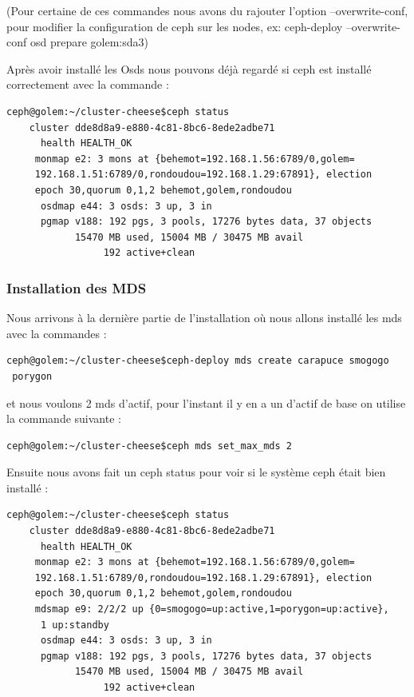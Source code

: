 \documentclass[12pt]{article}
\begin{document}
(Pour certaine de ces commandes nous avons du rajouter l'option --overwrite-conf, pour modifier la configuration de ceph sur les nodes, 
ex: ceph-deploy --overwrite-conf osd prepare golem:sda3)

Après avoir installé les Osds nous pouvons déjà regardé si ceph est installé correctement avec la commande :
\begin{verbatim}
ceph@golem:~/cluster-cheese$ceph status     
    cluster dde8d8a9-e880-4c81-8bc6-8ede2adbe71
      health HEALTH_OK  
     monmap e2: 3 mons at {behemot=192.168.1.56:6789/0,golem=
     192.168.1.51:6789/0,rondoudou=192.168.1.29:67891}, election 
     epoch 30,quorum 0,1,2 behemot,golem,rondoudou 
      osdmap e44: 3 osds: 3 up, 3 in 
      pgmap v188: 192 pgs, 3 pools, 17276 bytes data, 37 objects 
            15470 MB used, 15004 MB / 30475 MB avail 
                 192 active+clean 
\end{verbatim}


\subsubsection{Installation des MDS}

Nous arrivons à la dernière partie de l'installation où nous allons installé les mds avec la commandes :
\begin{verbatim}
ceph@golem:~/cluster-cheese$ceph-deploy mds create carapuce smogogo
 porygon
\end{verbatim}

et nous voulons 2 mds d'actif, pour l'instant il y en a un d'actif de base on utilise la commande suivante :
\begin{verbatim}
ceph@golem:~/cluster-cheese$ceph mds set_max_mds 2
\end{verbatim}

Ensuite nous avons fait un ceph status pour voir si le système ceph était bien installé :
\begin{verbatim}
ceph@golem:~/cluster-cheese$ceph status     
    cluster dde8d8a9-e880-4c81-8bc6-8ede2adbe71
      health HEALTH_OK  
     monmap e2: 3 mons at {behemot=192.168.1.56:6789/0,golem=
     192.168.1.51:6789/0,rondoudou=192.168.1.29:67891}, election 
     epoch 30,quorum 0,1,2 behemot,golem,rondoudou 
     mdsmap e9: 2/2/2 up {0=smogogo=up:active,1=porygon=up:active},
      1 up:standby
      osdmap e44: 3 osds: 3 up, 3 in 
      pgmap v188: 192 pgs, 3 pools, 17276 bytes data, 37 objects 
            15470 MB used, 15004 MB / 30475 MB avail 
                 192 active+clean 
\end{verbatim} 
\end{document}

